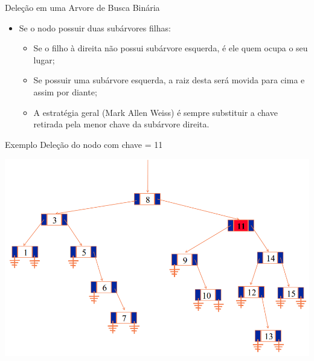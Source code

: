 \documentclass[12pt,table,xcolor={dvipsnames}]{beamer}
\begin{document}
\begin{frame}[fragile]{Deleção em uma Arvore de Busca Binária}
          \begin{itemize}
          \item Se o nodo possuir duas subárvores filhas:
		  \begin{itemize}
		  \item Se o filho à direita não possui subárvore esquerda, é ele quem ocupa o seu lugar;
		  \item Se possuir uma subárvore esquerda, a raiz desta será movida para cima e assim por diante;
		  \item A estratégia geral (Mark Allen Weiss) é sempre substituir a chave retirada pela menor chave da subárvore direita.
		  \end{itemize}
       	  \end{itemize}
\end{frame}

\begin{frame}[fragile]{Exemplo}
Deleção do nodo com chave = 11
\begin{center}
\includegraphics[scale=.3]{arv13.png} 
\end{center}
\end{frame}
\end{document}
